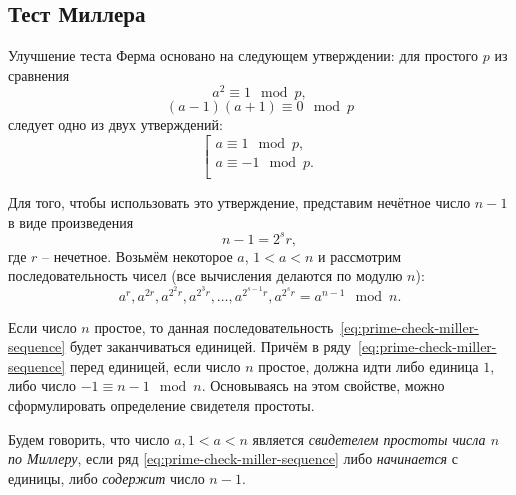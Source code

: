 \subsection{Тест Миллера}\label{section-prime-check-miller}

Улучшение теста Ферма основано на следующем утверждении: для простого $p$ из сравнения
    \[ a^2 \equiv 1 \mod p, \]
    \[ (a-1)(a+1) \equiv 0 \mod p \]
следует одно из двух утверждений: 
\[ \left[ \begin{array}{l}
     a \equiv 1 \mod p, \\
     a \equiv -1 \mod p. \\
\end{array} \right. \]

Для того, чтобы использовать это утверждение, представим нечётное число $n - 1$ в виде произведения
    \[ n-1 = 2^s r, \]
где $r$ -- нечетное. Возьмём некоторое $a$, $1 < a < n$ и рассмотрим последовательность чисел (все вычисления делаются по модулю $n$):
\begin{equation}\label{eq:prime-check-miller-sequence}
	a^{r}, a^{2r}, a^{2^2 r}, a^{2^3 r}, \dots, a^{2^{s-1} r}, a^{2^s r} = a^{n-1} \mod n.
\end{equation}

Если число $n$ простое, то данная последовательность~\ref{eq:prime-check-miller-sequence} будет заканчиваться единицей. Причём в ряду~\ref{eq:prime-check-miller-sequence} перед единицей, если число $n$ простое, должна идти либо единица $1$, либо число $-1 \equiv n-1 \mod n$. Основываясь на этом свойстве, можно сформулировать определение свидетеля простоты.

Будем говорить, что число $a, 1 < a < n$ является \emph{свидетелем простоты числа $n$ по Миллеру}, если ряд \ref{eq:prime-check-miller-sequence} либо \emph{начинается} с единицы, либо \emph{содержит} число $n-1$.

